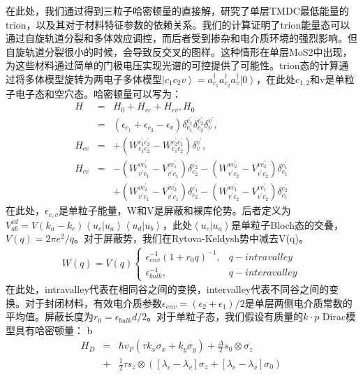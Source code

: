 \documentclass[reprint, aps, prb, showkeys]{revtex4-2}
\begin{document}
在此处，我们通过得到三粒子哈密顿量的直接解，研究了单层TMDC最低能量的trion，以及其对于材料特征参数的依赖关系。我们的计算证明了trion能量态可以通过自旋轨道分裂和多体效应调控，而后者受到掺杂和电介质环境的强烈影响。但自旋轨道分裂很小的时候，会导致反交叉的图样。这种情形在单层MoS2中出现，为这些材料通过简单的门极电压实现光谱的可控提供了可能性。trion态的计算通过将多体模型旋转为两电子多体模型$\left\vert c_1 c_2 v \right\rangle = a_{c_1}^{\dagger} a_{c_2}^{\dagger} a_{v}^{\dagger} \left\vert 0 \right\rangle$，在此处$c_{1,2}$和v是单粒子电子态和空穴态。哈密顿量可以写为：
\begin{eqnarray}
    H &=& H_0 + H_{cc} + H_{cv}, H_0 \nonumber\\
      &=& (\epsilon_{c_1} + \epsilon_{c_2} - \epsilon_v) \delta_{c_1}^{c_1^{'}} \delta_{c_2}^{c_2^{'}} \delta_{v}^{v^{'}}, \nonumber \\
    H_{cc} &=& + (W_{c_1 c_2}^{c_1^{'} c_2^{'}} - W_{c_1 c_2}^{c_2^{'} c_1^{'}}) \delta_v^{v^{'}}, \nonumber \\
    H_{cv} &=& -(W_{v^{'} c_1}^{v c_1^{'}} - V_{v^{'} c_1}^{v c_1^{'}}) \delta_{c_2}^{c_2^{'}} - (W_{v^{'} c_2}^{v c_2^{'}} - V_{v^{'} c_2}^{v c_2^{'}}) \delta_{c_1}^{c_1^{'}} \nonumber \\
    && + (W_{v^{'} c_1}^{v c_2^{'}} - V_{v^{'} c_1}^{v c_2^{'}}) \delta_{c_2}^{c_1^{'}} - (W_{v^{'} c_2}^{v c_1^{'}} - V_{v^{'} c_2}^{v c_1^{'}}) \delta_{c_1}^{c_2^{'}} \label{eqn:Hamiltonian}
\end{eqnarray}
在此处，$\epsilon_{c,v}$是单粒子能量，W和V是屏蔽和裸库伦势。后者定义为$V_{ab}^{cd} = V(k_a - k_c) \left\langle u_c \vert u_a \right\rangle \left\langle u_d \vert u_b \right\rangle $，此处$\left\langle u_c \vert u_a \right\rangle$是单粒子Bloch态的交叠，$V(q) = 2 \pi e^2 /q$。对于屏蔽势，我们在Rytova-Keldysh势中减去V(q)。
\begin{eqnarray}
    W(q) = V(q) 
    \begin{cases}
        \epsilon_{env}^{-1} (1 + r_0 q)^{-1},  &q-intravalley \\
        \epsilon_{bulk}^{-1}, &q-interavalley
    \end{cases}
\end{eqnarray}
在此处，intravalley代表在相同谷之间的变换，intervalley代表不同谷之间的变换。对于封闭材料，有效电介质参数$\epsilon_{env} = (\epsilon_2 + \epsilon_1)/2$是单层两侧电介质常数的平均值。屏蔽长度为$r_0 = \epsilon_{bulk} d/2$。对于单粒子态，我们假设有质量的$k \cdot p$ Dirac模型具有哈密顿量：
b\begin{eqnarray}
    H_D &=& \hbar v_F (\tau k_x \sigma_x + k_y \sigma_y) + \frac{\Delta}{2} s_0 \otimes \sigma_z \nonumber \\
    &+& \frac{1}{2} \tau s_z \otimes \left( [\lambda_c - \lambda_v] \sigma_z + [\lambda_c - \lambda_v] \sigma_0 \right) \label{eqn:DiracModel}
\end{eqnarray}
\end{document}
